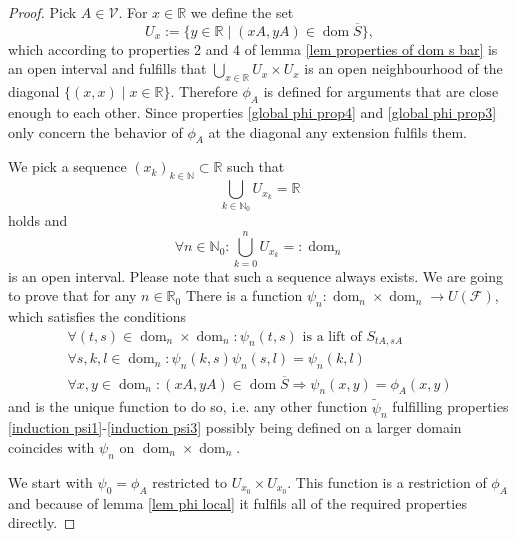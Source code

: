 \documentclass[b5paper,draft,openbib,12pt]{memoir}
\DeclareMathOperator{\dom}{dom}
\begin{document}
\begin{proof}
Pick \(A\in\mathcal{V}\). For \(x\in\mathbb{R}\) we define the set
\begin{equation}\label{def U x}
U_x:=\{y\in\mathbb{R}\mid (x A, y A)\in \dom\overline{S}\},
\end{equation}
which according to properties 2 and 4 of lemma 
\ref{lem properties of dom s bar} is an open interval and
fulfills that \(\bigcup_{x\in\mathbb{R}} U_x\times U_x\) is an open 
neighbourhood of the diagonal \(\{(x,x)\mid x \in\mathbb{R}\}\).
Therefore \(\phi_A\) is defined for arguments that are
close enough to each other. Since 
properties \eqref{global phi prop4} and \eqref{global phi prop3} 
only concern the behavior of \(\phi_A\) at the diagonal any
extension fulfils them. 

We pick a sequence \((x_k)_{k\in\mathbb{N}}\subset \mathbb{R}\) such
that 
\begin{equation}\label{open cover of R}
\bigcup_{k\in\mathbb{N}_0} U_{x_k} = \mathbb{R}
\end{equation}
holds and 
\begin{equation}
  \forall n \in \mathbb{N}_0: \bigcup_{k=0}^n U_{x_k}=:\dom_n
\end{equation}
is an open interval. Please note that such a sequence always exists. 
We are going to prove that for any \(n\in\mathbb{R}_0\) 
There is a function \(\psi_n:\dom_n\times\dom_n\to U(\mathcal{F})\), 
which satisfies the conditions
\begin{align}\label{induction psi1}
\forall (t,s)\in \dom_n\times \dom_n: \psi_n(t,s) \text{ is a lift of } S_{tA, sA}\\\label{induction psi2}
\forall s,k,l\in\dom_n: \psi_n(k,s)\psi_n(s,l)=\psi_n(k,l)\\\label{induction psi3}
\forall x,y\in\dom_n: (xA, yA)\in\dom\overline{S}\Rightarrow  \psi_n(x,y)=\phi_A(x,y)
\end{align}
and is the unique function to do so, i.e. 
any other function \(\tilde{\psi}_{n}\) fulfilling properties 
\eqref{induction psi1}-\eqref{induction psi3} possibly being defined
on a larger domain coincides with \(\psi_n\) on \(\dom_n\times\dom_n\).

We start with \(\psi_0=\phi_A\)  
restricted to \(U_{x_0} \times U_{x_0}\).
This function is a restriction of \(\phi_A\) and because of 
lemma \ref{lem phi local} it 
fulfils all of the required properties directly. 
 

\end{proof}
\end{document}
